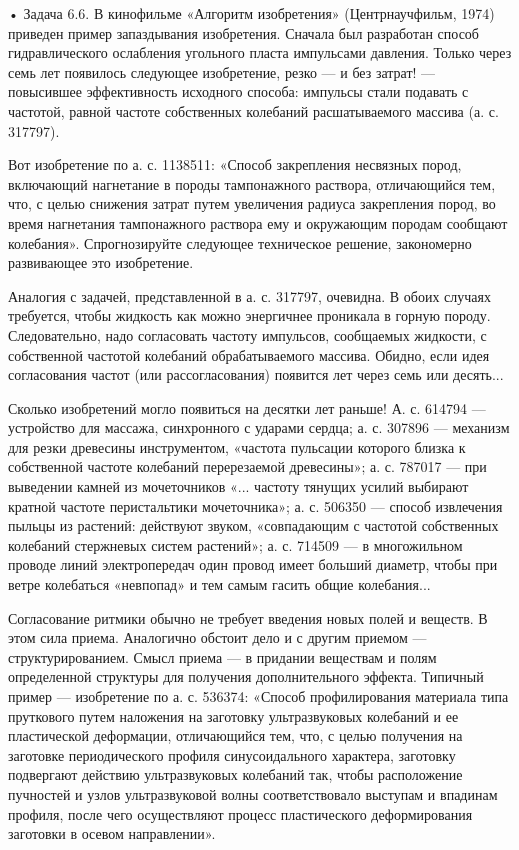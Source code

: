 •  Задача 6.6.  В кинофильме  «Алгоритм изобретения»  (Центрнаучфильм,
1974) приведен пример запаздывания изобретения. Сначала был разработан
способ   гидравлического   ослабления  угольного   пласта   импульсами
давления. Только через семь лет появилось следующее изобретение, резко
— и без затрат! — повысившее эффективность исходного способа: импульсы
стали  подавать  с  частотой,  равной  частоте  собственных  колебаний
расшатываемого массива (а. с. 317797).

Вот изобретение по а. с. 1138511: «Способ закрепления несвязных пород,
включающий  нагнетание в  породы  тампонажного раствора,  отличающийся
тем, что, с целью снижения затрат путем увеличения радиуса закрепления
пород,  во время  нагнетания  тампонажного раствора  ему и  окружающим
породам  сообщают  колебания».  Спрогнозируйте  следующее  техническое
решение, закономерно развивающее это изобретение.

Аналогия с задачей,  представленной в а. с. 317797,  очевидна. В обоих
случаях  требуется, чтобы  жидкость как  можно энергичнее  проникала в
горную  породу.  Следовательно,  надо согласовать  частоту  импульсов,
сообщаемых жидкости, с  собственной частотой колебаний обрабатываемого
массива. Обидно,  если идея согласования частот  (или рассогласования)
появится лет через семь или десять...

Сколько  изобретений могло  появиться  на десятки  лет  раньше! А.  с.
614794  — устройство  для массажа,  синхронного с  ударами сердца;  а.
с.  307896  —  механизм  для резки  древесины  инструментом,  «частота
пульсации которого близка к собственной частоте колебаний перерезаемой
древесины»;  а.  с. 787017  —  при  выведении камней  из  мочеточников
«...  частоту тянущих  усилий выбирают  кратной частоте  перистальтики
мочеточника»; а.  с. 506350  — способ  извлечения пыльцы  из растений:
действуют  звуком,  «совпадающим   с  частотой  собственных  колебаний
стержневых систем  растений»; а.  с. 714509  — в  многожильном проводе
линий  электропередач один  провод  имеет больший  диаметр, чтобы  при
ветре колебаться «невпопад» и тем самым гасить общие колебания...


Согласование ритмики обычно не требует введения новых полей и веществ.
В  этом сила  приема. Аналогично  обстоит дело  и с  другим приемом  —
структурированием.  Смысл  приема  —  в  придании  веществам  и  полям
определенной структуры для получения дополнительного эффекта. Типичный
пример — изобретение по а. с. 536374: «Способ профилирования материала
типа пруткового путем наложения  на заготовку ультразвуковых колебаний
и ее пластической деформации, отличающийся тем, что, с целью получения
на   заготовке  периодического   профиля  синусоидального   характера,
заготовку  подвергают  действию  ультразвуковых колебаний  так,  чтобы
расположение  пучностей и  узлов ультразвуковой  волны соответствовало
выступам  и   впадинам  профиля,   после  чего   осуществляют  процесс
пластического деформирования заготовки в осевом направлении».

